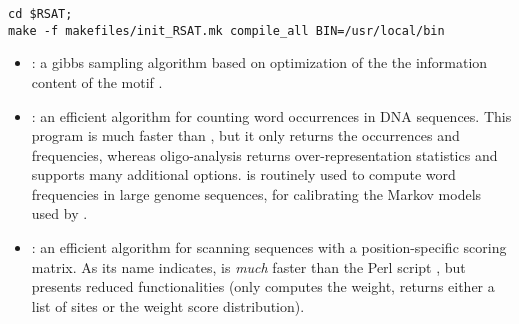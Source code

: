 \documentclass[12pt,a4paper, oneside]{scrreprt} %
\begin{document}
\begin{lstlisting}
cd $RSAT;
make -f makefiles/init_RSAT.mk compile_all BIN=/usr/local/bin
\end{lstlisting}


\begin{itemize}
\item {}: a gibbs sampling algorithm based on
  optimization of the the information content of the motif
  \cite{Defrance:2009}.

\item {}: an efficient algorithm for counting word
  occurrences in DNA sequences. This program is much faster than
  , but it only returns the occurrences and
  frequencies, whereas oligo-analysis returns over-representation
  statistics and supports many additional
  options.  is routinely used to compute word
  frequencies in large genome sequences, for calibrating the Markov
  models used by .

\item {}: an efficient algorithm for scanning
  sequences with a position-specific scoring matrix. As its name
  indicates,  is \emph{much} faster than
  the Perl script , but presents reduced
  functionalities (only computes the weight, returns either a list of
  sites or the weight score distribution).
\end{itemize}














\end{document}
